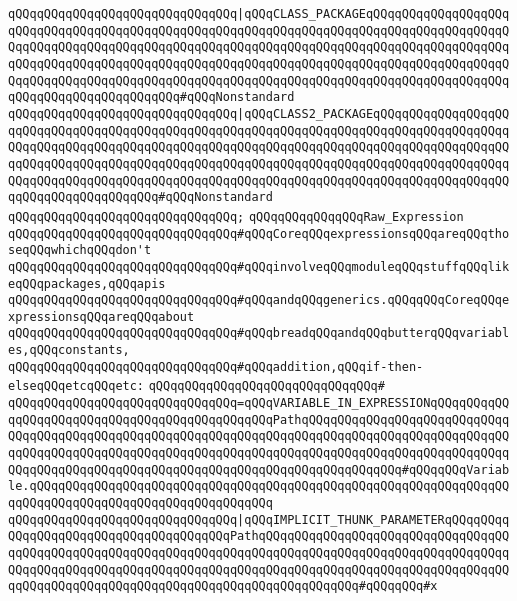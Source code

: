 \verb|qQQqqQQqqQQqqQQqqQQqqQQqqQQqqQQq|\verb#|qQQqCLASS_PACKAGEqQQqqQQqqQQqqQQqqQQqqQQqqQQqqQQqqQQqqQQqqQQqqQQqqQQqqQQqqQQqqQQqqQQqqQQqqQQqqQQqqQQqqQQqqQQqqQQqqQQqqQQqqQQqqQQqqQQqqQQqqQQqqQQqqQQqqQQqqQQqqQQqqQQqqQQqqQQqqQQqqQQqqQQqqQQqqQQqqQQqqQQqqQQqqQQqqQQqqQQqqQQqqQQqqQQqqQQqqQQqqQQqqQQqqQQqqQQqqQQqqQQqqQQqqQQqqQQqqQQqqQQqqQQqqQQqqQQqqQQqqQQqqQQqqQQqqQQqqQQqqQQqqQQqqQQqqQQqqQQqqQQq#\verb|#qQQqNonstandard|\newline
\verb|qQQqqQQqqQQqqQQqqQQqqQQqqQQqqQQq|\verb#|qQQqCLASS2_PACKAGEqQQqqQQqqQQqqQQqqQQqqQQqqQQqqQQqqQQqqQQqqQQqqQQqqQQqqQQqqQQqqQQqqQQqqQQqqQQqqQQqqQQqqQQqqQQqqQQqqQQqqQQqqQQqqQQqqQQqqQQqqQQqqQQqqQQqqQQqqQQqqQQqqQQqqQQqqQQqqQQqqQQqqQQqqQQqqQQqqQQqqQQqqQQqqQQqqQQqqQQqqQQqqQQqqQQqqQQqqQQqqQQqqQQqqQQqqQQqqQQqqQQqqQQqqQQqqQQqqQQqqQQqqQQqqQQqqQQqqQQqqQQqqQQqqQQqqQQqqQQqqQQqqQQqqQQqqQQqqQQq#\verb|#qQQqNonstandard|\newline
\verb|qQQqqQQqqQQqqQQqqQQqqQQqqQQqqQQq;|\newline
\newline
\verb|qQQqqQQqqQQqqQQqRaw_Expression|\newline
\newline
\verb|qQQqqQQqqQQqqQQqqQQqqQQqqQQqqQQq#qQQqCoreqQQqexpressionsqQQqareqQQqthoseqQQqwhichqQQqdon't|\newline
\verb|qQQqqQQqqQQqqQQqqQQqqQQqqQQqqQQq#qQQqinvolveqQQqmoduleqQQqstuffqQQqlikeqQQqpackages,qQQqapis|\newline
\verb|qQQqqQQqqQQqqQQqqQQqqQQqqQQqqQQq#qQQqandqQQqgenerics.qQQqqQQqCoreqQQqexpressionsqQQqareqQQqabout|\newline
\verb|qQQqqQQqqQQqqQQqqQQqqQQqqQQqqQQq#qQQqbreadqQQqandqQQqbutterqQQqvariables,qQQqconstants,|\newline
\verb|qQQqqQQqqQQqqQQqqQQqqQQqqQQqqQQq#qQQqaddition,qQQqif-then-elseqQQqetcqQQqetc:|\newline
\verb|qQQqqQQqqQQqqQQqqQQqqQQqqQQqqQQq#|\newline
\verb|qQQqqQQqqQQqqQQqqQQqqQQqqQQqqQQq=qQQqVARIABLE_IN_EXPRESSIONqQQqqQQqqQQqqQQqqQQqqQQqqQQqqQQqqQQqqQQqqQQqqQQqPathqQQqqQQqqQQqqQQqqQQqqQQqqQQqqQQqqQQqqQQqqQQqqQQqqQQqqQQqqQQqqQQqqQQqqQQqqQQqqQQqqQQqqQQqqQQqqQQqqQQqqQQqqQQqqQQqqQQqqQQqqQQqqQQqqQQqqQQqqQQqqQQqqQQqqQQqqQQqqQQqqQQqqQQqqQQqqQQqqQQqqQQqqQQqqQQqqQQqqQQqqQQqqQQqqQQqqQQqqQQqqQQq#qQQqqQQqVariable.qQQqqQQqqQQqqQQqqQQqqQQqqQQqqQQqqQQqqQQqqQQqqQQqqQQqqQQqqQQqqQQqqQQqqQQqqQQqqQQqqQQqqQQqqQQqqQQqqQQqqQQq|\newline
\verb|qQQqqQQqqQQqqQQqqQQqqQQqqQQqqQQq|\verb#|qQQqIMPLICIT_THUNK_PARAMETERqQQqqQQqqQQqqQQqqQQqqQQqqQQqqQQqqQQqqQQqPathqQQqqQQqqQQqqQQqqQQqqQQqqQQqqQQqqQQqqQQqqQQqqQQqqQQqqQQqqQQqqQQqqQQqqQQqqQQqqQQqqQQqqQQqqQQqqQQqqQQqqQQqqQQqqQQqqQQqqQQqqQQqqQQqqQQqqQQqqQQqqQQqqQQqqQQqqQQqqQQqqQQqqQQqqQQqqQQqqQQqqQQqqQQqqQQqqQQqqQQqqQQqqQQqqQQqqQQqqQQqqQQq#\verb|#qQQqqQQq#x|\newline

